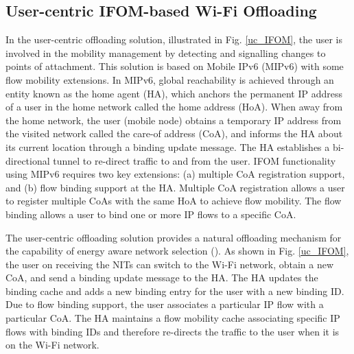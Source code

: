 \documentclass[journal]{IEEEtran}
\begin{document}
\subsection{User-centric IFOM-based Wi-Fi Offloading}
In the user-centric offloading solution, illustrated in Fig. \ref{uc_IFOM}, the user is involved in the mobility management by detecting and signalling changes to points of attachment. This solution is based on Mobile IPv6 (MIPv6) \cite{rfc3775} with some flow mobility extensions. In MIPv6, global reachability is achieved through an entity known as the home agent (HA), which anchors the permanent IP address of a user in the home network called the home address (HoA). When away from the home network, the user (mobile node) obtains a temporary IP address from the visited network called the care-of address (CoA), and informs the HA about its current location through a binding update message. The HA establishes a bi-directional tunnel to re-direct traffic to and from the user. IFOM functionality using MIPv6 requires two key extensions: (a) multiple CoA registration support, and (b) flow binding support at the HA. Multiple CoA registration allows a user to register multiple CoAs with the same HoA to achieve flow mobility. The flow binding allows a user to bind one or more IP flows to a specific CoA. 

The user-centric offloading solution provides a natural offloading mechanism for the capability of energy aware network selection (). As shown in Fig. \ref{uc_IFOM}, the user on receiving the NITs can switch to the Wi-Fi network, obtain a new CoA, and send a binding update message to the HA. The HA updates the binding cache and adds a new binding entry for the user with a new binding ID. Due to flow binding support, the user associates  a particular IP flow with a particular CoA. The HA maintains a flow mobility cache associating specific IP flows with  binding IDs and therefore re-directs the traffic to the user when it is on the Wi-Fi network. 
\end{document}
